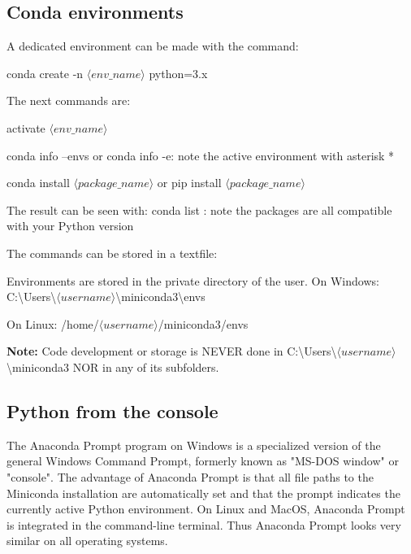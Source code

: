 \subsection{Conda environments}
\label{appendix:environments}

A dedicated environment can be made with the command:

\textsf{conda create -n $\langle env\_name \rangle$ python=3.x}

The next commands are:

\textsf{activate $\langle env\_name \rangle$}

\textsf{conda info --envs} or \textsf{conda info -e}: note the active environment with asterisk *

\textsf{conda install $\langle package\_name \rangle$}
or
\textsf{pip install $\langle package\_name \rangle$}

The result can be seen with: \textsf{conda list} : note the packages are all compatible with your Python version

The commands can be stored in a textfile:



Environments are stored in the private directory of the user. On Windows: 
C:\textbackslash Users\textbackslash $\langle username\rangle$\textbackslash miniconda3\textbackslash envs 

On Linux: /home/$\langle username\rangle$/miniconda3/envs

\textbf{Note:} Code development or storage is NEVER done in C:\textbackslash Users\textbackslash $\langle username\rangle$\textbackslash miniconda3 NOR in any of its subfolders.

\subsection{Python from the console}
\label{appendix:console}

The \textsf{Anaconda Prompt} program on Windows is a specialized version of the general Windows \textsf{Command Prompt}, formerly known as "MS-DOS window" or "console". The advantage of \textsf{Anaconda Prompt} is that all file paths to the Miniconda installation are automatically set and that the prompt indicates the currently active Python environment. On Linux and MacOS, \textsf{Anaconda Prompt} is integrated in the command-line terminal. Thus \textsf{Anaconda Prompt} looks very similar on all operating systems.

